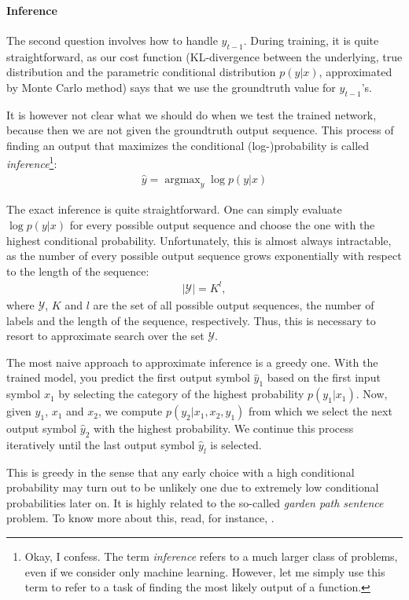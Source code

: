 \documentclass{report}
\newcommand{\YY}[0]{\mathcal{Y}}
\DeclareMathOperator*{\argmax}{\arg \max}
\begin{document}
\paragraph{Inference}
The second question involves how to handle $y_{t-1}$. During training, it is
quite straightforward, as our cost function (KL-divergence between the
underlying, true distribution and the parametric conditional distribution
$p(y|x)$, approximated by Monte Carlo method) says that we use the groundtruth
value for $y_{t-1}$'s. 

It is however not clear what we should do when we test the trained network,
because then we are not given the groundtruth output sequence. This process of
finding an output that maximizes the conditional (log-)probability is called
{\em inference}\footnote{
    Okay, I confess. The term {\em inference} refers to a much larger class of
    problems, even if we consider only machine learning. However, let me simply
    use this term to refer to a task of finding the most likely output of a
    function.
}:
\begin{align*}
    \hat{y} = \argmax_y \log p(y|x)
\end{align*}

The exact inference is quite straightforward. One can simply evaluate $\log
p(y|x)$ for every possible output sequence and choose the one with the highest
conditional probability. Unfortunately, this is almost always intractable, as
the number of every possible output sequence grows exponentially with respect to
the length of the sequence:
\begin{align*}
    |\YY| = K^l,
\end{align*}
where $\YY$, $K$ and $l$ are the set of all possible output sequences, the
number of labels and the length of the sequence, respectively. Thus, this is
necessary to resort to approximate search over the set $\YY$.

The most naive approach to approximate inference is a greedy one. With the
trained model, you predict the first output symbol $\hat{y}_1$ based on the
first input symbol $x_1$ by selecting the category of the highest probability
$p(y_1|x_1)$. Now, given $\hat{y}_1$, $x_1$ and $x_2$, we compute
$p(y_2|x_1,x_2,y_1)$ from which we select the next output symbol $\hat{y}_2$
with the highest probability. We continue this process iteratively until the
last output symbol $\hat{y}_l$ is selected.

This is greedy in the sense that any early choice with a high conditional
probability may turn out to be unlikely one due to extremely low conditional
probabilities later on. It is highly related to the so-called {\em garden path
sentence} problem. To know more about this, read, for instance,
\citet[][Sec.~3.2.4]{manning1999foundations}.
\end{document}
